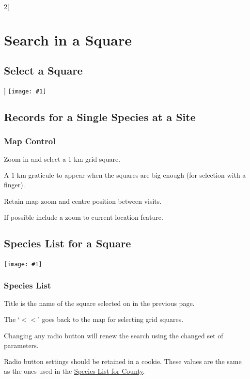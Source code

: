 \documentclass[a4paper,12pt,landscape]{article}
\newcommand{\wireframe}[1]{\texttt{[image: \#1]}\clearpage}
\begin{document}
\begin{multicols*}{2}[%
  \section{Search in a Square}%
  \subsection{Select a Square}%
]
\thispagestyle{empty}
\wireframe{./wireframes/Squares__Index.png}%

\subsection{Records for a Single Species at a Site}

\subsubsection*{Map Control}

\begin{todolist}
  \item Zoom in and select a 1 km grid square.
  \item A 1 km graticule to appear when the squares are big enough (for selection with a finger).
  \item Retain map zoom and centre position between visits.
  \item If possible include a zoom to current location feature.
\end{todolist}

\clearpage

\subsection{Species List for a Square}

\wireframe{./wireframes/Species__ListForSquare.png}%

\subsubsection*{Species List}

\begin{todolist}
  \item Title is the name of the square selected on in the previous page.
  \item The `$<<$' goes back to the map for selecting grid squares.
  \item Changing any radio button will renew the search using the changed set of parameters.
  \item Radio button settings should be retained in a cookie.
    These values are the same as the ones used in the \hyperref[sec:species-list-for-county]{Species List for County}.
\end{todolist}


\end{multicols*}
\end{document}
